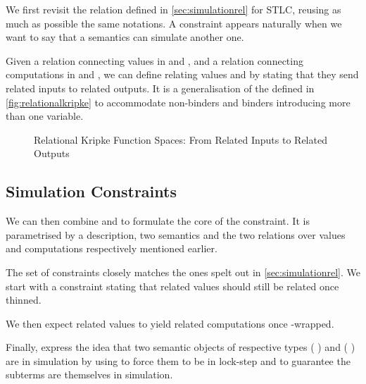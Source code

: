 We first revisit the  relation defined in \cref{sec:simulationrel}
for STLC, reusing as much as possible the same notations. A  constraint
appears naturally when we want to say that a semantics can simulate another one.

Given a relation  connecting values in  and , and a relation
 connecting computations in  and , we can define 
relating values    and    by
stating that they send related inputs to related outputs. It is a generalisation of
the  defined in \cref{fig:relationalkripke} to accommodate non-binders
and binders introducing more than one variable.

\begin{figure}[h]
\caption{Relational Kripke Function Spaces: From Related Inputs to Related Outputs}
\end{figure}

\subsection{Simulation Constraints}

We can then combine  and  to formulate the
core of the  constraint. It is parametrised by a description, two
semantics and the two relations over values and computations respectively mentioned
earlier.


The set of constraints closely matches the ones spelt out in \cref{sec:simulationrel}.
We start with a constraint  stating that related values should still be
related once thinned.


We then expect related values to yield related computations once -wrapped.


Finally,  express the idea that two semantic objects of respective types
   (  )
and    (  ) are in simulation by using
 to force them to be in lock-step and  to guarantee the subterms
are themselves in simulation.

